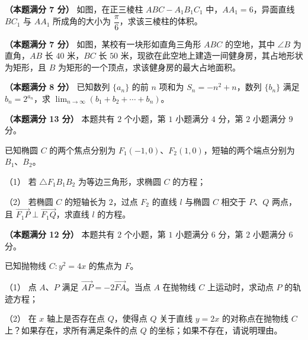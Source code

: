 \Needspace{0.4\textheight}
\begin{question}
\textbf{（本题满分 7 分）} 如图，在正三棱柱 $ABC-A_1B_1C_1$ 中，$AA_1=6$，异面直线 $BC_1$ 与 $AA_1$ 所成角的大小为 $\dfrac\pi6$，求该三棱柱的体积。
\nopagebreak[4]
\begin{center}\end{center}
\nopagebreak[4]
\Needspace{0.4\textheight}
\end{question}
\begin{question}
\textbf{（本题满分 7 分）} 如图，某校有一块形如直角三角形 $ABC$ 的空地，其中 $\angle B$ 为直角，$AB$ 长 $40$ 米，$BC$ 长 $50$ 米，现欲在此空地上建造一间健身房，其占地形状为矩形，且 $B$ 为矩形的一个顶点，求该健身房的最大占地面积。
\nopagebreak[4]
\begin{center}\end{center}
\nopagebreak[4]
\end{question}
\begin{question}
\textbf{（本题满分 8 分）} 已知数列 $\{a_n\}$ 的前 $n$ 项和为 $S_n=-n^2+n$，数列 $\{b_n\}$ 满足 $b_n=2^{a_n}$，求 $\displaystyle\lim_{n\to\infty}(b_1+b_2+\cdots+b_n)$。

\end{question}
\begin{question}
\textbf{（本题满分 13 分）} 本题共有 $2$ 个小题，第 $1$ 小题满分 $4$ 分，第 $2$ 小题满分 $9$ 分。

已知椭圆 $C$ 的两个焦点分别为 $F_1(-1,0)$、$F_2(1,0)$，短轴的两个端点分别为 $B_1$、$B_2$。

（1） 若 $\triangle F_1B_1B_2$ 为等边三角形，求椭圆 $C$ 的方程；

（2） 若椭圆 $C$ 的短轴长为 $2$，过点 $F_2$ 的直线 $l$ 与椭圆 $C$ 相交于 $P$、$Q$ 两点，且 $\overrightarrow{F_1P}\perp\overrightarrow{F_1Q}$，求直线 $l$ 的方程。

\end{question}
\begin{question}
\textbf{（本题满分 12 分）} 本题共有 $2$ 个小题，第 $1$ 小题满分 $6$ 分，第 $2$ 小题满分 $6$ 分。

已知抛物线 $C:y^2=4x$ 的焦点为 $F$。

（1） 点 $A$、$P$ 满足 $\overrightarrow{AP}=-2\overrightarrow{FA}$。当点 $A$ 在抛物线 $C$ 上运动时，求动点 $P$ 的轨迹方程；

（2） 在 $x$ 轴上是否存在点 $Q$，使得点 $Q$ 关于直线 $y=2x$ 的对称点在抛物线 $C$ 上？如果存在，求所有满足条件的点 $Q$ 的坐标；如果不存在，请说明理由。

\Needspace{0.4\textheight}
\end{question}

